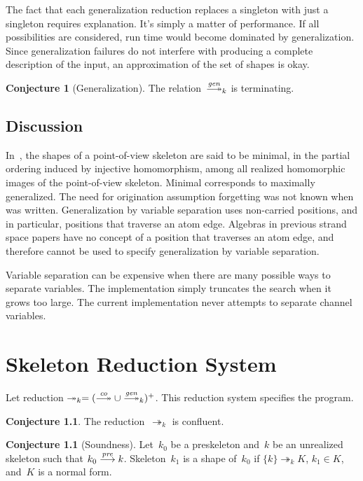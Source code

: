 \documentclass[12pt]{report}
\theoremstyle{definition}
\newtheorem{conj}[thm]{Conjecture}
\begin{document}
The fact that each generalization reduction replaces a singleton with
just a singleton requires explanation.  It's simply a matter of
performance.  If all possibilities are considered, {\cpsa} run time
would become dominated by generalization.  Since generalization
failures do not interfere with producing a complete description of the
input, an approximation of the set of shapes is okay.

\begin{conj}[Generalization]
The relation~$\setreduction{\fn{gen}}_k$ is terminating.
\end{conj}

\section*{Discussion}
In~\cite{DoghmiGuttmanThayer07}, the shapes of a point-of-view
skeleton are said to be minimal, in the partial ordering induced by
injective homomorphism, among all realized homomorphic images of the
point-of-view skeleton.  Minimal corresponds to maximally generalized.
The need for origination assumption forgetting was not known
when~\cite{DoghmiGuttmanThayer07} was written.  Generalization by
variable separation uses non-carried positions, and in particular,
positions that traverse an atom edge.  Algebras in previous strand
space papers have no concept of a position that traverses an atom
edge, and therefore cannot be used to specify generalization by
variable separation.

Variable separation can be expensive when there are many possible ways
to separate variables.  The implementation simply truncates the search
when it grows too large.  The current implementation never attempts to
separate channel variables.

\chapter{Skeleton Reduction System}\label{chp:skeleton reduction}

Let reduction
$\twoheadrightarrow_k=(\setreduction{\fn{co}}\cup
\setreduction{\fn{gen}}_k)^+$.  This reduction system specifies the
{\cpsa} program.

\begin{conj}
The reduction~$\twoheadrightarrow_k$ is confluent.
\end{conj}

\begin{conj}[Soundness]\label{cnj:soundness}
Let~$k_0$ be a preskeleton and~$k$ be an unrealized skeleton such that
$k_0\stackrel{\operatorname{\mathit{pre}}}{\longrightarrow}k$.  Skeleton~$k_1$ is a shape of~$k_0$ if
$\{k\}\twoheadrightarrow_k K$, $k_1\in K$, and~$K$ is a normal form.
\end{conj}
\end{document}
